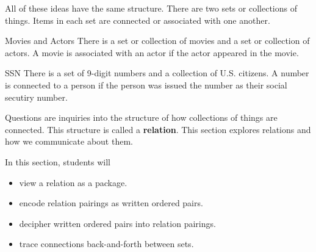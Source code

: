 \documentclass{ximera}
\begin{document}
All of these ideas have the same structure.  There are two sets or collections of things.  Items in each set are connected or associated with one another.



\begin{example} Movies and Actors
There is a set or collection of movies and a set or collection of actors.  A movie is associated with an actor if the actor appeared in the movie.
\end{example}

\begin{example} SSN
There is a set of 9-digit numbers and a collection of U.S. citizens.  A number is connected to a person if the person was issued the number as their social secutiry number.
\end{example}


Questions are inquiries into the structure of how collections of things are connected. This structure is called a \textbf{relation}. This section explores relations and how we communicate about them.











\begin{sectionOutcomes}
In this section, students will 

\begin{itemize}
\item view a relation as a package.
\item encode relation pairings as written ordered pairs.
\item decipher written ordered pairs into relation pairings.
\item trace connections back-and-forth between sets.
\end{itemize}
\end{sectionOutcomes}
\end{document}
